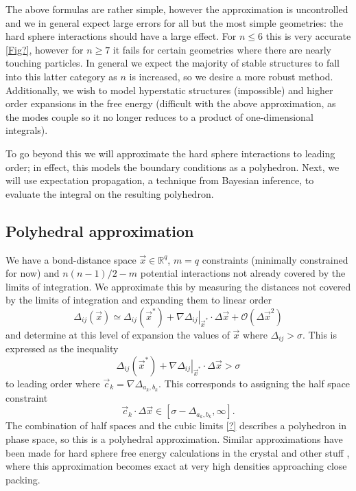 \documentclass[11pt,twoside]{report}
\begin{document}
The above formulas are rather simple, however the approximation is uncontrolled and we in general expect large errors for all but the most simple geometries: the hard sphere interactions should have a large effect.
For $n \le 6$ this is very accurate \ref{Fig?}, however for $n \ge 7$ it fails for certain geometries where there are nearly touching particles.
In general we expect the majority of stable structures to fall into this latter category as $n$ is increased, so we desire a more robust method.
Additionally, we wish to model hyperstatic structures (impossible) and higher order expansions in the free energy (difficult with the above approximation, as the modes couple so it no longer reduces to a product of one-dimensional integrals).

To go beyond this we will approximate the hard sphere interactions to leading order; in effect, this models the boundary conditions as a polyhedron.
Next, we will use expectation propagation, a technique from Bayesian inference, to evaluate the integral on the resulting polyhedron.

\subsection{Polyhedral approximation}

We have a bond-distance space $\vec{x} \in \mathbb{R}^q$, $m = q$ constraints (minimally constrained for now) and $n(n-1)/2 - m$ potential interactions not already covered by the limits of integration.
We approximate this by measuring the distances not covered by the limits of integration and expanding them to linear order
\begin{equation}
  \Delta_{ij}(\vec{x})
  \simeq
  \Delta_{ij}(\vec{x}^*)
  + \left. \nabla \Delta_{ij} \right|_{\vec{x}^*} \cdot \Delta \vec{x}
  + \mathcal{O}(\Delta \vec{x}^2)
\end{equation}
and determine at this level of expansion the values of $\vec{x}$ where $\Delta_{ij} > \sigma$.
This is expressed as the inequality
\begin{equation}
  \Delta_{ij}(\vec{x}^*)
  + \left. \nabla \Delta_{ij} \right|_{\vec{x}^*} \cdot \Delta \vec{x}
  > \sigma
\end{equation}
to leading order where $\vec{c}_k = \nabla \Delta_{a_k,b_k}$.
This corresponds to assigning the half space constraint
\begin{equation}
  \vec{c}_k \cdot \Delta \vec{x} \in [\sigma - \Delta_{a_k,b_k}, \infty].
\end{equation}
The combination of half spaces and the cubic limits \eqref{?} describes a polyhedron in phase space, so this is a polyhedral approximation.
Similar approximations have been made for hard sphere free energy calculations in the crystal \cite{?} and other stuff \cite{Leoni?}, where this approximation becomes exact at very high densities approaching close packing.
\end{document}
